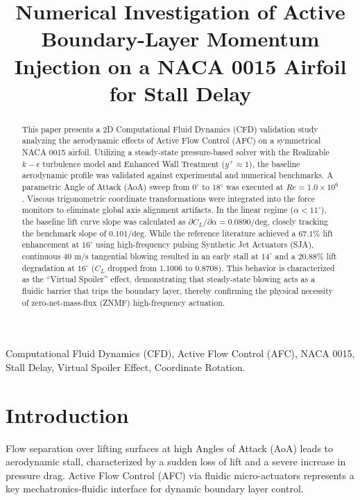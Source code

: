 \documentclass[conference]{IEEEtran}
\begin{document}
\title{Numerical Investigation of Active Boundary-Layer Momentum Injection on a NACA 0015 Airfoil for Stall Delay}

\author{
}

\maketitle

\begin{abstract}
This paper presents a 2D Computational Fluid Dynamics (CFD) validation study analyzing the aerodynamic effects of Active Flow Control (AFC) on a symmetrical NACA 0015 airfoil. Utilizing a steady-state pressure-based solver with the Realizable $k-\epsilon$ turbulence model and Enhanced Wall Treatment ($y^+ \approx 1$), the baseline aerodynamic profile was validated against experimental and numerical benchmarks. A parametric Angle of Attack (AoA) sweep from $0^\circ$ to $18^\circ$ was executed at $Re = 1.0 \times 10^6$. Viscous trigonometric coordinate transformations were integrated into the force monitors to eliminate global axis alignment artifacts. In the linear regime ($\alpha < 11^\circ$), the baseline lift curve slope was calculated as $\partial C_L / \partial \alpha = 0.0890/\text{deg}$, closely tracking the benchmark slope of $0.101/\text{deg}$. While the reference literature achieved a $67.1\%$ lift enhancement at $16^\circ$ using high-frequency pulsing Synthetic Jet Actuators (SJA), continuous $40\text{ m/s}$ tangential blowing resulted in an early stall at $14^\circ$ and a $20.88\%$ lift degradation at $16^\circ$ ($C_L$ dropped from $1.1006$ to $0.8708$). This behavior is characterized as the ``Virtual Spoiler'' effect, demonstrating that steady-state blowing acts as a fluidic barrier that trips the boundary layer, thereby confirming the physical necessity of zero-net-mass-flux (ZNMF) high-frequency actuation.
\end{abstract}

\begin{IEEEkeywords}
Computational Fluid Dynamics (CFD), Active Flow Control (AFC), NACA 0015, Stall Delay, Virtual Spoiler Effect, Coordinate Rotation.
\end{IEEEkeywords}

\section{Introduction}
Flow separation over lifting surfaces at high Angles of Attack (AoA) leads to aerodynamic stall, characterized by a sudden loss of lift and a severe increase in pressure drag. Active Flow Control (AFC) via fluidic micro-actuators represents a key mechatronics-fluidic interface for dynamic boundary layer control. 
\end{document}
